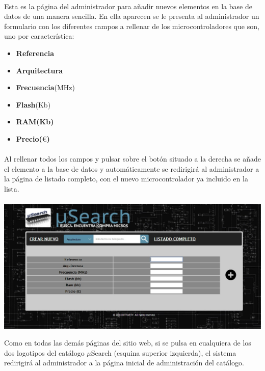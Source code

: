 \paragraph{} Esta es la página del administrador para añadir nuevos elementos en la base de datos de una manera sencilla. En ella aparecen se le presenta al administrador un formulario con los diferentes campos a rellenar de los microcontroladores que son, uno por característica:
\begin{itemize}
\item \textbf{Referencia}
\item \textbf{Arquitectura}
\item \textbf{Frecuencia}(MHz) 
\item \textbf{Flash}(Kb)
\item \textbf{RAM(Kb)} 
\item \textbf{Precio($\euro$)}
\end{itemize}

\paragraph{} Al rellenar todos los campos y pulsar sobre el botón situado a la derecha se añade el elemento a la base de datos y automáticamente se redirigirá al administrador a la página de listado completo, con el nuevo microcontrolador ya incluido en la lista.

\begin{center}
	\paragraph{}\includegraphics[scale=0.35]{img/anyadir}\singlelinebreak
\end{center}

Como en todas las demás páginas del sitio web, si se pulsa en cualquiera de los dos logotipos del catálogo $\mu$Search (esquina superior izquierda), el sistema redirigirá al administrador a la página inicial de administración del catálogo.

